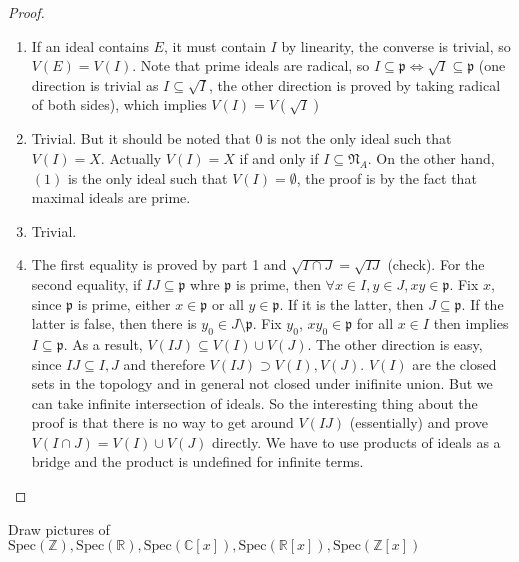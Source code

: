 \documentclass{solution}
\begin{document}
\begin{proof}
    \begin{enumerate}
        \item If an ideal contains $E$, it must contain $I$ by linearity, the converse is trivial, so $V(E) = V(I)$. Note that prime ideals are radical, so $I \subseteq \mathfrak{p} \Leftrightarrow \sqrt{I} \subseteq \mathfrak{p}$ (one direction is trivial as $I \subseteq \sqrt{I}$, the other direction is proved by taking radical of both sides), which implies $V(I) = V(\sqrt{I})$
        \item Trivial. {\color{red} But it should be noted that $0$ is not the only ideal such that $V(I) = X$. Actually $V(I) = X$ if and only if $I \subseteq \mathfrak{N}_A$. On the other hand, $(1)$ is the only ideal such that $V(I) = \emptyset$, the proof is by the fact that maximal ideals are prime.}
        \item Trivial.
        \item The first equality is proved by part 1 and $\sqrt{I \cap J} = \sqrt{IJ}$ (check). For the second equality, if $IJ \subseteq \mathfrak{p}$ whre $\mathfrak{p}$ is prime, then $\forall x \in I, y \in J, xy \in \mathfrak{p}$. Fix $x$, since $\mathfrak{p}$ is prime, either $x \in \mathfrak{p}$ or all $y \in \mathfrak{p}$. If it is the latter, then $J \subseteq \mathfrak{p}$. If the latter is false, then there is $y_0 \in J \setminus \mathfrak{p}$. Fix $y_0$, $xy_0 \in \mathfrak{p}$ for all $x \in I$ then implies $I \subseteq \mathfrak{p}$. As a result, $V(IJ) \subseteq V(I) \cup V(J)$. The other direction is easy, since $IJ \subseteq I, J$ and therefore $V(IJ) \supset V(I), V(J)$. {\color{red} $V(I)$ are the closed sets in the topology and in general not closed under inifinite union. But we can take infinite intersection of ideals. So the interesting thing about the proof is that there is no way to get around $V(IJ)$ (essentially) and prove $V(I \cap J) = V(I) \cup V(J)$ directly. We have to use products of ideals as a bridge and the product is undefined for infinite terms.}
    \end{enumerate}
\end{proof}

\begin{problem}
    Draw pictures of $\mathrm{Spec}(\mathbb{Z}), \mathrm{Spec}(\mathbb{R}), \mathrm{Spec}(\mathbb{C}[x]), \mathrm{Spec}(\mathbb{R}[x]), \mathrm{Spec}(\mathbb{Z}[x])$
\end{problem}
\end{document}
